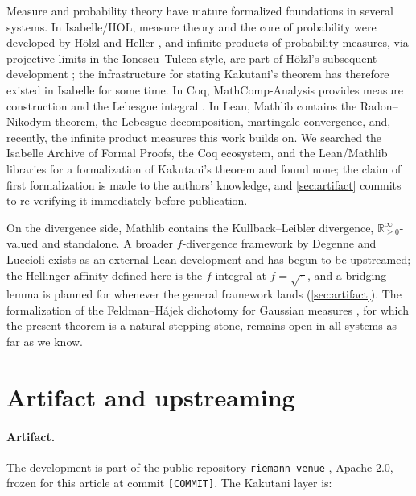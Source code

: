 \documentclass[a4paper,UKenglish,autoref,thm-restate]{lipics-v2021}
\newcommand{\ennreal}{\ensuremath{\mathbb{R}_{\ge 0}^{\infty}}}
\begin{document}
Measure and probability theory have mature formalized foundations in several
systems. In Isabelle/HOL, measure theory and the core of probability were
developed by H\"olzl and Heller \cite{hoelzl2011}, and infinite products of
probability measures, via projective limits in the Ionescu--Tulcea style, are
part of H\"olzl's subsequent development \cite{hoelzl2013}; the infrastructure
for stating Kakutani's theorem has therefore existed in Isabelle for some
time. In Coq, MathComp-Analysis provides measure construction and the
Lebesgue integral \cite{affeldtcohen2023}. In Lean, Mathlib
\cite{mathlib2020} contains the Radon--Nikodym theorem, the Lebesgue
decomposition, martingale convergence, and, recently, the infinite product
measures this work builds on. We searched the Isabelle Archive of Formal
Proofs, the Coq ecosystem, and the Lean/Mathlib libraries for a formalization
of Kakutani's theorem and found none; the claim of first formalization is
made to the authors' knowledge, and \autoref{sec:artifact} commits to
re-verifying it immediately before publication.

On the divergence side, Mathlib contains the Kullback--Leibler divergence,
\ennreal-valued and standalone. A broader $f$-divergence framework by Degenne
and Luccioli \cite{testinglowerbounds} exists as an external Lean development
and has begun to be upstreamed; the Hellinger affinity defined here is the
$f$-integral at $f = \sqrt{\cdot\,}$, and a bridging lemma is planned for
whenever the general framework lands (\autoref{sec:artifact}). The
formalization of the Feldman--H\'ajek dichotomy for Gaussian measures
\cite{feldman1958,hajek1958}, for which the present theorem is a natural
stepping stone, remains open in all systems as far as we know.

\section{Artifact and upstreaming}
\label{sec:artifact}

\paragraph*{Artifact.} The development is part of the public repository
\texttt{riemann-venue} \cite{riemannvenue}, Apache-2.0, frozen for this
article at commit \texttt{[COMMIT]}.
The Kakutani layer is:
\end{document}
